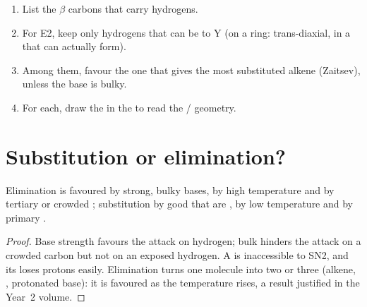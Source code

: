\begin{method}\label{met:b1:elimination:predict-alkene}
\begin{enumerate}
  \item List the $\beta$ carbons that carry hydrogens.
  \item For E2, keep only hydrogens that can be  to Y (on a
        ring: trans-diaxial, in a  that can actually form).
  \item Among them, favour the one that gives the most substituted alkene
        (Zaitsev), unless the base is bulky.
  \item For each, draw the  in the  to
        read the / geometry.
\end{enumerate}
\end{method}

\section{Substitution or elimination?}

\begin{proposition}\label{prop:b1:elimination:sn-vs-e}
Elimination is favoured by strong, bulky bases, by high temperature and by
tertiary or crowded ; substitution by good  that are
, by low temperature and by primary .
\end{proposition}

\begin{proof}
Base strength favours the attack on hydrogen; bulk hinders the attack on
a crowded carbon but not on an exposed hydrogen. A  is
inaccessible to SN2, and its  loses protons easily. Elimination
turns one molecule into two or three (alkene, , protonated
base): it is favoured as the temperature rises, a result justified in
the Year~2 volume.
\end{proof}

